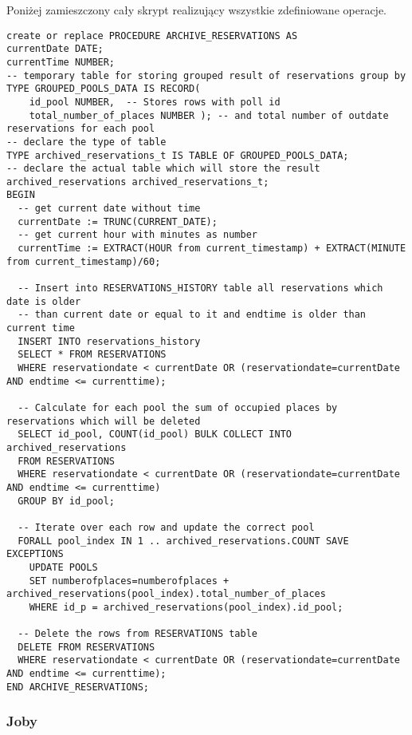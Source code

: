 \documentclass[a4paper]{article}
\begin{document}
Poniżej zamieszczony cały skrypt realizujący wszystkie zdefiniowane operacje.

\newpage

\begin{verbatim}
create or replace PROCEDURE ARCHIVE_RESERVATIONS AS
currentDate DATE;
currentTime NUMBER;
-- temporary table for storing grouped result of reservations group by
TYPE GROUPED_POOLS_DATA IS RECORD(
    id_pool NUMBER,  -- Stores rows with poll id
    total_number_of_places NUMBER ); -- and total number of outdate reservations for each pool
-- declare the type of table
TYPE archived_reservations_t IS TABLE OF GROUPED_POOLS_DATA;
-- declare the actual table which will store the result
archived_reservations archived_reservations_t; 
BEGIN
  -- get current date without time
  currentDate := TRUNC(CURRENT_DATE);
  -- get current hour with minutes as number
  currentTime := EXTRACT(HOUR from current_timestamp) + EXTRACT(MINUTE from current_timestamp)/60; 
    
  -- Insert into RESERVATIONS_HISTORY table all reservations which date is older
  -- than current date or equal to it and endtime is older than current time
  INSERT INTO reservations_history
  SELECT * FROM RESERVATIONS
  WHERE reservationdate < currentDate OR (reservationdate=currentDate AND endtime <= currenttime);
  
  -- Calculate for each pool the sum of occupied places by reservations which will be deleted
  SELECT id_pool, COUNT(id_pool) BULK COLLECT INTO archived_reservations
  FROM RESERVATIONS
  WHERE reservationdate < currentDate OR (reservationdate=currentDate AND endtime <= currenttime)
  GROUP BY id_pool;
  
  -- Iterate over each row and update the correct pool
  FORALL pool_index IN 1 .. archived_reservations.COUNT SAVE EXCEPTIONS
    UPDATE POOLS
    SET numberofplaces=numberofplaces + archived_reservations(pool_index).total_number_of_places
    WHERE id_p = archived_reservations(pool_index).id_pool;
    
  -- Delete the rows from RESERVATIONS table
  DELETE FROM RESERVATIONS
  WHERE reservationdate < currentDate OR (reservationdate=currentDate AND endtime <= currenttime);
END ARCHIVE_RESERVATIONS;
\end{verbatim}


\subsubsection{Joby}
\end{document}
